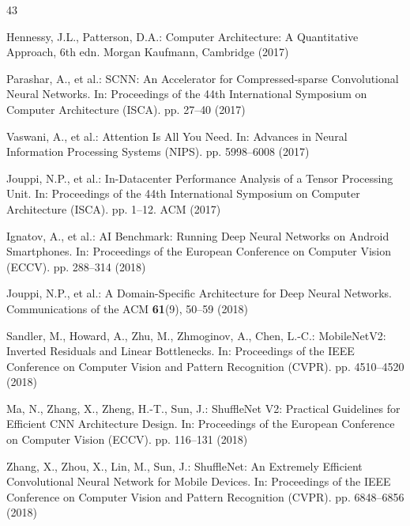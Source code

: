 \documentclass[conference]{IEEEtran}
\begin{document}
\begin{thebibliography}{43}

Hennessy, J.L., Patterson, D.A.: Computer Architecture: A Quantitative Approach, 6th edn. Morgan Kaufmann, Cambridge (2017)


Parashar, A., et al.: SCNN: An Accelerator for Compressed-sparse Convolutional Neural Networks. In: Proceedings of the 44th International Symposium on Computer Architecture (ISCA). pp. 27--40 (2017)


Vaswani, A., et al.: Attention Is All You Need. In: Advances in Neural Information Processing Systems (NIPS). pp. 5998--6008 (2017)


Jouppi, N.P., et al.: In-Datacenter Performance Analysis of a Tensor Processing Unit. In: Proceedings of the 44th International Symposium on Computer Architecture (ISCA). pp. 1--12. ACM (2017)


Ignatov, A., et al.: AI Benchmark: Running Deep Neural Networks on Android Smartphones. In: Proceedings of the European Conference on Computer Vision (ECCV). pp. 288--314 (2018)


Jouppi, N.P., et al.: A Domain-Specific Architecture for Deep Neural Networks. Communications of the ACM \textbf{61}(9), 50--59 (2018)


Sandler, M., Howard, A., Zhu, M., Zhmoginov, A., Chen, L.-C.: MobileNetV2: Inverted Residuals and Linear Bottlenecks. In: Proceedings of the IEEE Conference on Computer Vision and Pattern Recognition (CVPR). pp. 4510--4520 (2018)


Ma, N., Zhang, X., Zheng, H.-T., Sun, J.: ShuffleNet V2: Practical Guidelines for Efficient CNN Architecture Design. In: Proceedings of the European Conference on Computer Vision (ECCV). pp. 116--131 (2018)


Zhang, X., Zhou, X., Lin, M., Sun, J.: ShuffleNet: An Extremely Efficient Convolutional Neural Network for Mobile Devices. In: Proceedings of the IEEE Conference on Computer Vision and Pattern Recognition (CVPR). pp. 6848--6856 (2018)


\end{thebibliography}
\end{document}
